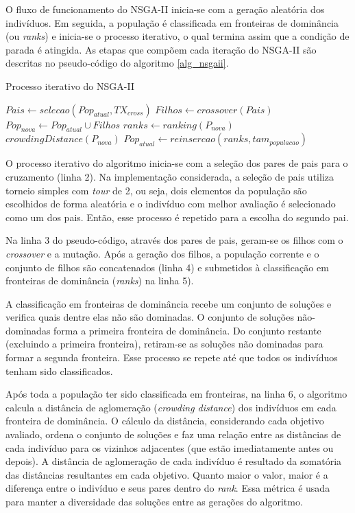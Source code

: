 O fluxo de funcionamento do NSGA-II inicia-se com a geração aleatória dos indivíduos. Em seguida, a população é classificada em fronteiras de dominância (ou \textit{ranks}) e inicia-se o processo iterativo, o qual termina assim que a condição de parada é atingida. As etapas que compõem cada iteração do NSGA-II são descritas no pseudo-código do algoritmo \ref{alg_nsgaii}.

\begin{algorithm}
	\caption{Processo iterativo do NSGA-II}
	\label{alg_nsgaii}
	\begin{algorithmic}[1]
		\State $Pais \gets selecao(Pop_{atual}, TX_{cross})$
		\State $Filhos \gets crossover(Pais)$
		\State $Pop_{nova} \gets Pop_{atual} \cup Filhos$
		\State $ranks \gets ranking(P_{nova})$
		\State $crowdingDistance(P_{nova})$
		\State $Pop_{atual} \gets reinsercao(ranks, tam_{populacao})$
		\EndWhile
	\end{algorithmic}
\end{algorithm}

O processo iterativo do algoritmo inicia-se com a seleção dos pares de pais para o cruzamento (linha 2). Na implementação considerada, a seleção de pais utiliza torneio simples com \textit{tour} de 2, ou seja, dois elementos da população são escolhidos de forma aleatória e o indivíduo com melhor avaliação é selecionado como um dos pais. Então, esse processo é repetido para a escolha do segundo pai.

Na linha 3 do pseudo-código, através dos pares de pais, geram-se os filhos com o \textit{crossover} e a mutação. Após a geração dos filhos, a população corrente e o conjunto de filhos são concatenados (linha 4) e submetidos à classificação em fronteiras de dominância (\textit{ranks}) na linha 5).

A classificação em fronteiras de dominância recebe um conjunto de soluções e verifica quais dentre elas não são dominadas. O conjunto de soluções não-dominadas forma a primeira fronteira de dominância. Do conjunto restante (excluindo a primeira fronteira), retiram-se as soluções não dominadas para formar a segunda fronteira. Esse processo se repete até que todos os indivíduos tenham sido classificados.

Após toda a população ter sido classificada em fronteiras, na linha 6, o algoritmo calcula a distância de aglomeração (\textit{crowding distance}) dos indivíduos em cada fronteira de dominância. O cálculo da distância, considerando cada objetivo avaliado, ordena o conjunto de soluções e faz uma relação entre as distâncias de cada indivíduo para os vizinhos adjacentes (que estão imediatamente antes ou depois). A distância de aglomeração de cada indivíduo é resultado da somatória das distâncias resultantes em cada objetivo.  Quanto maior o valor, maior é a diferença entre o indivíduo e seus pares dentro do \textit{rank}. Essa métrica é usada para manter a diversidade das soluções entre as gerações do algoritmo.


